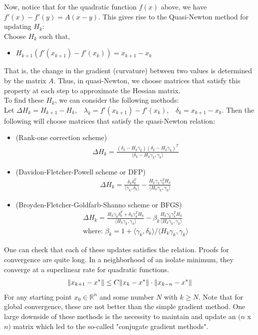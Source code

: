\documentclass[12pt,a4paper]{article}
\begin{document}
	Now, notice that for the quadratic function $f(x)$ above, we have $f'(x) - f'(y) = A(x-y)$. This gives rise to the Quasi-Newton method for updating $H_k$: \\
	Choose $H_k$ such that,
	\begin{itemize}
		\item $H_{k+1}(f'(x_{k+1}) - f'(x_k)) = x_{k+1} - x_k$
	\end{itemize}
	That is, the change in the gradient (curvature) between two values is determined by the matrix $A$. Thus, in quasi-Newton, we choose matrices that satisfy this property at each step to approximate the Hessian matrix. \\
	To find these $H_k$, we can consider the following methods:\\
	Let $\Delta H_k = H_{k+1} - H_k, \hspace{10pt} \lambda_k = f'(x_{k+1}) - f'(x_k), \hspace{10pt} \delta_k = x_{k+1} - x_k$. Then the following will choose matrices that satisfy the quasi-Newton relation:
	\begin{itemize}
		\item  (Rank-one correction scheme)
		\begin{align*}
			\Delta H_k = \frac{(\delta_k - H_k\gamma_k)(\delta_k - H_k\gamma_k)^T}{\langle \delta_k - H_k\gamma_k, \gamma_k \rangle }
		\end{align*}
		\item (Davidon-Fletcher-Powell scheme or DFP) 
		\begin{align*}
			\Delta H_k = \frac{\delta_k \delta_k^T}{\langle \gamma_k, \delta_k \rangle} - \frac{H_k\gamma_k \gamma_k^T H_k}{\langle H_k\gamma_k, \gamma_k \rangle }
		\end{align*}
		\item (Broyden-Fletcher-Goldfarb-Shanno scheme or BFGS)
		\begin{align*}
			\Delta H_k = \frac{H_k\gamma_k\delta_k^T + \delta_k\gamma_k^TH_k}{\langle H_k\gamma_k, \gamma_k \rangle} - \beta_k \frac{H_k\gamma_k\gamma_k^TH_k}{\langle H_k\gamma_k, \gamma_k \rangle } \\
			\text{where: } \beta_k = 1+ \langle \gamma_k, \delta_k \rangle / \langle H_k\gamma_k, \gamma_k \rangle
		\end{align*}
	\end{itemize}
	One can check that each of these updates satisfies the relation. Proofs for convergence are quite long. In a neighborhood of an isolate minimum, they converge at a superlinear rate for quadratic functions. 
	\begin{align*}
		\norm{x_{k+1} - x^*} \leq C \norm{x_k - x^*}\cdot \norm{x_{k-n} - x^*}
	\end{align*}
	For any starting point $x_0 \in \mathbb{R}^n$ and some number $N$ with $k \geq N$. Note that for global convergence, these are not better than the simple gradient method. One large downside of these methods is the necessity to maintain and update an $(n$ x $n)$ matrix which led to the so-called "conjugate gradient methods".
	
\end{document}

